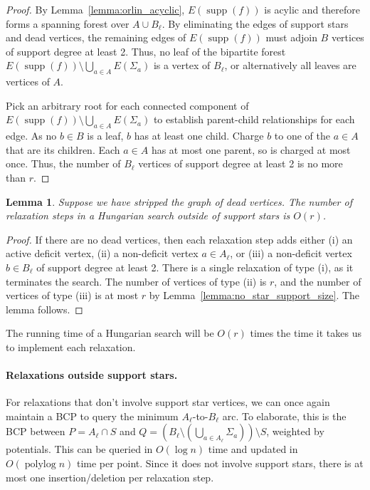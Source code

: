 \documentclass[11pt]{article}
\def\polylog{\mathop{\mathrm{polylog}}}
\def\supp{\operatorname{supp}}
\theoremstyle{plain}
\newtheorem{lemma}{Lemma}[section]
\numberwithin{figure}{section}
\begin{document}
\begin{proof}
By Lemma~\ref{lemma:orlin_acyclic}, $E(\supp(f))$ is acylic and therefore forms
a spanning forest over $A \cup B_\ell$.
By eliminating the edges of support stars and dead vertices, the remaining
edges of $E(\supp(f))$ must adjoin $B$ vertices of support degree at least 2.
Thus, no leaf of the bipartite forest
$E(\supp(f)) \setminus \bigcup_{a \in A} E(\Sigma_a)$ is a vertex of $B_\ell$,
or alternatively all leaves are vertices of $A$.

Pick an arbitrary root for each connected component of
$E(\supp(f)) \setminus \bigcup_{a \in A} E(\Sigma_a)$ to establish parent-child
relationships for each edge.
As no $b \in B$ is a leaf, $b$ has at least one child.
Charge $b$ to one of the $a \in A$ that are its children.
Each $a \in A$ has at most one parent, so is charged at most once.
Thus, the number of $B_\ell$ vertices of support degree at least 2 is no more
than $r$.
\end{proof}

\begin{lemma}
\label{lemma:orlin_relax_count}
Suppose we have stripped the graph of dead vertices.
The number of relaxation steps in a Hungarian search outside of support stars
is $O(r)$.
\end{lemma}

\begin{proof}
If there are no dead vertices, then each relaxation step adds either
(i) an active deficit vertex,
(ii) a non-deficit vertex $a \in A_\ell$, or
(iii) a non-deficit vertex $b \in B_\ell$ of support degree at least 2.
There is a single relaxation of type (i), as it terminates the search.
The number of vertices of type (ii) is $r$, and the number of vertices of type
(iii) is at most $r$ by Lemma~\ref{lemma:no_star_support_size}.
The lemma follows.
\end{proof}

The running time of a Hungarian search will be $O(r)$ times the time it takes
us to implement each relaxation.

\paragraph{Relaxations outside support stars.}
For relaxations that don't involve support star vertices, we can once again
maintain a BCP to query the minimum $A_\ell$-to-$B_\ell$ arc.
To elaborate, this is the BCP between $P = A_\ell \cap S$ and
$Q = (B_\ell \setminus (\bigcup_{a \in A_\ell} \Sigma_a)) \setminus S$,
weighted by potentials.
This can be queried in $O(\log n)$ time and updated in $O(\polylog n)$ time per
point.
Since it does not involve support stars, there is at most one
insertion/deletion per relaxation step.
\end{document}
